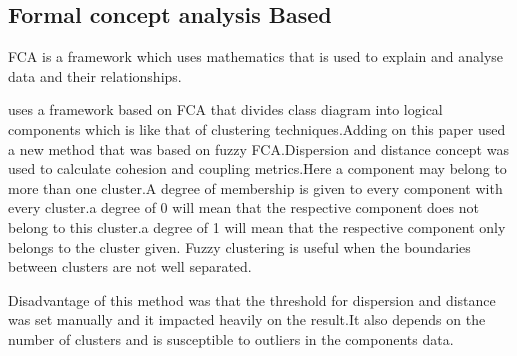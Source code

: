 \documentclass[12pt]{article}
\begin{document}
\subsection{Formal concept analysis Based}
FCA is a framework which uses mathematics that is used to
explain and analyse data and their relationships\cite{FCA1}.

\cite{FCA} uses a framework based on FCA that divides class diagram into logical components which is like that of clustering techniques.Adding on this paper \cite{FCA} used a new method that was based on fuzzy FCA.Dispersion and distance concept was used to calculate cohesion and coupling metrics.Here a component may belong to more than one cluster.A degree of membership is given to every component with every cluster.a degree of 0 will mean that the respective component does not belong to this cluster.a degree of 1 will mean that the respective component only belongs to the cluster given. Fuzzy clustering  is useful when the boundaries between clusters are not well separated.


Disadvantage of this method was that the threshold for dispersion and distance was set manually and it impacted heavily on the result.It also depends on the number of clusters and is susceptible to outliers in the components data.
\end{document}
